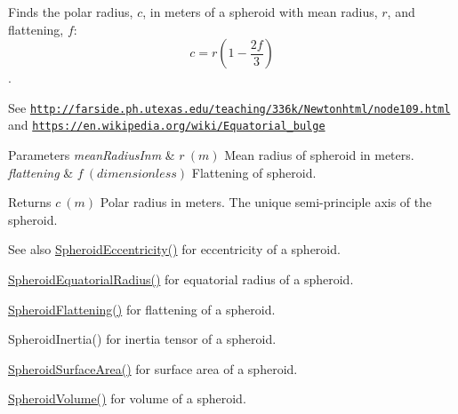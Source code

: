 Finds the polar radius, $c$, in meters of a spheroid with mean radius, $r$, and flattening, $f$\+: \[ c = r \left (1 - \dfrac{2f}{3} \right ) \]. 

See \href{http://farside.ph.utexas.edu/teaching/336k/Newtonhtml/node109.html}{\tt http\+://farside.\+ph.\+utexas.\+edu/teaching/336k/\+Newtonhtml/node109.\+html} and \href{https://en.wikipedia.org/wiki/Equatorial_bulge}{\tt https\+://en.\+wikipedia.\+org/wiki/\+Equatorial\+\_\+bulge} 
\begin{DoxyParams}{Parameters}
{\em mean\+Radius\+Inm} & $ r\ (m)$ Mean radius of spheroid in meters. \\
\hline
{\em flattening} & $ f\ (dimensionless)$ Flattening of spheroid. \\
\hline
\end{DoxyParams}
\begin{DoxyReturn}{Returns}
$ c\ (m)$ Polar radius in meters. The unique semi-\/principle axis of the spheroid. 
\end{DoxyReturn}
\begin{DoxySeeAlso}{See also}
\mbox{\hyperlink{group___e_g_x_math-_geometry-3_d-_spheroid-_eccentricity_gab45680528a41bb7a5e15ddc0059156dd}{Spheroid\+Eccentricity()}} for eccentricity of a spheroid. 

\mbox{\hyperlink{group___e_g_x_math-_geometry-3_d-_spheroid-_equatorial_radius_ga1cbe564fee1b509c622d1c6d276158cd}{Spheroid\+Equatorial\+Radius()}} for equatorial radius of a spheroid. 

\mbox{\hyperlink{group___e_g_x_math-_geometry-3_d-_spheroid-_flattening_ga05e3be91f5f7fbaa9371687aa3834179}{Spheroid\+Flattening()}} for flattening of a spheroid. 

Spheroid\+Inertia() for inertia tensor of a spheroid. 

\mbox{\hyperlink{group___e_g_x_math-_geometry-3_d-_spheroid-_surface_area_ga5a3580e7ded82cb678a558905f41ae49}{Spheroid\+Surface\+Area()}} for surface area of a spheroid. 

\mbox{\hyperlink{group___e_g_x_math-_geometry-3_d-_spheroid-_volume_ga12125484235e94b8f2580f3476b05b92}{Spheroid\+Volume()}} for volume of a spheroid. 
\end{DoxySeeAlso}
